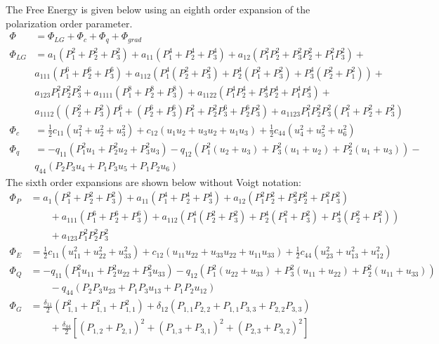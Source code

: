 \documentclass{article}
\begin{document}
The Free Energy is given below using an eighth order expansion of the polarization order parameter. \\
\begin{align}
\Phi &= \Phi_{LG}+\Phi_c+\Phi_q+\Phi_{grad} \\
\Phi_{LG} &= a_1 \left(P_1^2+P_2^2+P_3^2\right)+a_{11} \left(P_1^4+P_2^4+P_3^4\right)+a_{12} \left(P_1^2 P_2^2+P_3^2 P_2^2+P_1^2 P_3^2\right)+ \\ 
&a_{111} \left(P_1^6+P_2^6+P_3^6\right)+a_{112} \left( P_1^4\left(P_2^2+P_3^2\right)+P_2^4\left(P_1^2+P_3^2\right)+P_3^4 \left(P_2^2+P_1^2\right)\right)+ \nonumber \\  \nonumber
& a_{123} P_1^2 P_2^2 P_3^2 +a_{1111} \left(P_1^8+P_2^8+P_3^8\right)+a_{1122} \left(P_1^4 P_2^4+P_3^4 P_2^4+P_1^4 P_3^4\right)+\\
&a_{1112} \left(\left(P_2^2+P_3^2\right) P_1^6+\left(P_2^6+P_3^6\right) P_1^2+P_2^2 P_3^6+P_2^6 P_3^2\right)+a_{1123} P_1^2 P_2^2 P_3^2 \left(P_1^2+P_2^2+P_3^2\right)
\nonumber \\ \Phi_{c} &=\frac{1}{2} c_{11} \left(u_1^2+u_2^2+u_3^2\right)+ c_{12} \left(u_1 u_2+u_3 u_2+u_1 u_3\right)+\frac{1}{2} c_{44} \left(u_4^2+u_5^2+u_6^2\right) \\
\Phi_{q} &= -q_{11} \left(P_1^2 u_1+P_2^2 u_2+P_3^2 u_3\right)-q_{12} \left(P_1^2 \left(u_2+u_3\right)+P_3^2 \left(u_1+u_2\right)+P_2^2 \left(u_1+u_3\right)\right)- \\
& q_{44} \left(P_2 P_3 u_4+P_1 P_3 u_5+P_1 P_2 u_6\right) \nonumber
\end{align}
The sixth order expansions are shown below without Voigt notation:
\begin{align*}
\Phi_{P} &= a_1 \left(P_1^2+P_2^2+P_3^2\right)+a_{11} \left(P_1^4+P_2^4+P_3^4\right)+a_{12} \left(P_1^2 P_2^2+P_3^2 P_2^2+P_1^2 P_3^2\right) \\ 
& \qquad + a_{111} \left(P_1^6+P_2^6+P_3^6\right)+a_{112} \left( P_1^4\left(P_2^2+P_3^2\right)+P_2^4\left(P_1^2+P_3^2\right)+P_3^4 \left(P_2^2+P_1^2\right)\right) \nonumber \\ \nonumber & \qquad + a_{123} P_1^2 P_2^2 P_3^2 \\
\Phi_{E}&=\frac{1}{2} c_{11} \left(u_{11}^2+u_{22}^2+u_{33}^2\right)+ c_{12} \left(u_{11} u_{22}+u_{33} u_{22}+u_{11} u_{33}\right)+\frac{1}{2} c_{44} \left(u_{23}^2+u_{13}^2+u_{12}^2\right) \\
\Phi_{Q} &= -q_{11} \left(P_1^2 u_{11}+P_2^2 u_{22}+P_3^2 u_{33}\right)-q_{12} \left(P_1^2 \left(u_{22}+u_{33}\right)+P_3^2 \left(u_{11}+u_{22}\right)+P_2^2 \left(u_{11}+u_{33}\right)\right) \\
 & \qquad -q_{44} \left(P_2 P_3 u_{23}+P_1 P_3 u_{13}+P_1 P_2 u_{12}\right) \nonumber \\
 \Phi_{G} &= \frac{\delta_{11}}{2}(P_{1,1}^2+P_{1,1}^2+P_{1,1}^2)+\delta_{12}(P_{1,1} P_{2,2}+P_{1,1} P_{3,3}+ P_{2,2} P_{3,3}) \\
 & \qquad +\frac{\delta_{44}}{2}[(P_{1,2}+P_{2,1})^2+(P_{1,3}+P_{3,1})^2+(P_{2,3}+P_{3,2})^2]
\end{align*}
\end{document}
